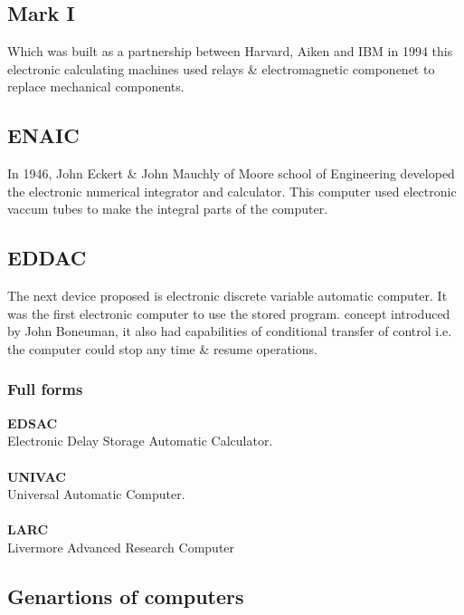 \documentclass{article}
\begin{document}
	\subsection{Mark I}
	Which was built as a partnership between Harvard, Aiken and IBM in 1994 this electronic calculating machines used relays \& electromagnetic componenet to replace mechanical components.
	
	\subsection{ENAIC}
	In 1946, John Eckert \& John Mauchly of Moore school of Engineering developed the electronic numerical integrator and calculator. This computer used electronic vaccum tubes to make the integral parts of the computer.
	
	\subsection{EDDAC}
	The next device proposed is electronic discrete variable automatic computer. It was the first electronic computer to use the stored program. concept introduced by John Boneuman, it also had capabilities of conditional transfer of control i.e. the computer could stop any time \& resume operations.
	
	\subsubsection{Full forms}
	\textbf{EDSAC} \\
	Electronic Delay Storage Automatic Calculator.
	\\ \\
	\textbf{UNIVAC} \\
	Universal Automatic Computer.
	\\ \\
	\textbf{LARC} \\
	Livermore Advanced Research Computer
	
	\subsection{Genartions of computers}
\end{document}
